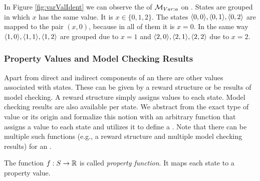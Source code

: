 \documentclass[preview]{standalone}
\begin{document}
\begin{exmp}
	In Figure \ref{fig:varValIdent} we can observe the \viewN of ${{{{{\mathcal{M}}}}_{{Var:{a}}}}}$ on \chgph. States are grouped in which $x$ has the same value. It is $x \in \{0, 1, 2\}$. The states ${\langle0,0\rangle}, {\langle0,1\rangle},{\langle0,2\rangle}$ are mapped to the pair $(x,0)$, because in all of them it is $x=0$. In the same way ${\langle1,0\rangle}, {\langle1,1\rangle},{\langle1,2\rangle}$ are grouped due to $x=1$ and ${\langle2,0\rangle}, {\langle2,1\rangle},{\langle2,2\rangle}$ due to $x=2$.
\end{exmp}
\subsubsection{Property Values and Model Checking Results}
Apart from direct and indirect components of an \mdpN there are other values associated with states. These can be given by a reward structure or be results of model checking. A reward structure simply assigns values to each state. Model checking results are also available per state. 
We abstract from the exact type of value or its origin and formalize this notion with an arbitrary function that assigns a value to each state and utilizes it to define a \viewN. Note that there can be multiple such functions (e.g., a reward structure and multiple model checking results) for an \chgphN.

\begin{definition}
	The function ${f} : {S} \to {\mathbb{R}}$ is called \emph{property function}. It maps each state to a property value.
\end{definition}
\end{document}
